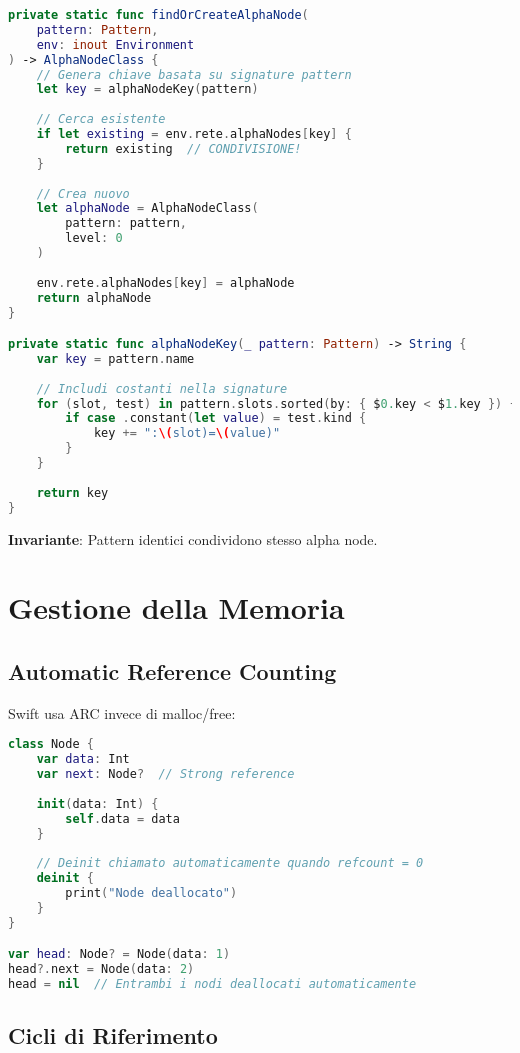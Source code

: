 \begin{lstlisting}[language=Swift]
private static func findOrCreateAlphaNode(
    pattern: Pattern,
    env: inout Environment
) -> AlphaNodeClass {
    // Genera chiave basata su signature pattern
    let key = alphaNodeKey(pattern)
    
    // Cerca esistente
    if let existing = env.rete.alphaNodes[key] {
        return existing  // CONDIVISIONE!
    }
    
    // Crea nuovo
    let alphaNode = AlphaNodeClass(
        pattern: pattern,
        level: 0
    )
    
    env.rete.alphaNodes[key] = alphaNode
    return alphaNode
}

private static func alphaNodeKey(_ pattern: Pattern) -> String {
    var key = pattern.name
    
    // Includi costanti nella signature
    for (slot, test) in pattern.slots.sorted(by: { $0.key < $1.key }) {
        if case .constant(let value) = test.kind {
            key += ":\(slot)=\(value)"
        }
    }
    
    return key
}
\end{lstlisting}

\textbf{Invariante}: Pattern identici condividono stesso alpha node.

\section{Gestione della Memoria}

\subsection{Automatic Reference Counting}

Swift usa ARC invece di malloc/free:

\begin{lstlisting}[language=Swift]
class Node {
    var data: Int
    var next: Node?  // Strong reference
    
    init(data: Int) {
        self.data = data
    }
    
    // Deinit chiamato automaticamente quando refcount = 0
    deinit {
        print("Node deallocato")
    }
}

var head: Node? = Node(data: 1)
head?.next = Node(data: 2)
head = nil  // Entrambi i nodi deallocati automaticamente
\end{lstlisting}

\subsection{Cicli di Riferimento}

